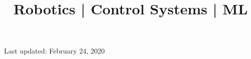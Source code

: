 \documentclass[10pt,a4paper]{moderncv}
\title{Robotics | Control Systems  | ML
	\newline
	\bf{\lb{\footnotesize
			Rerum Cognoscere Causas: To know the causes of things.} }}
\begin{document}
	\makecvtitle
	
	
	
	
	
	
	
	
	
	

	\footnotesize \centering Last updated: February 24, 2020
\clearpage
\end{document}
